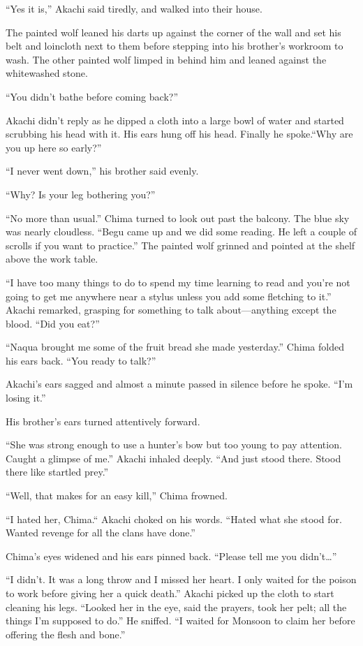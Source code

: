 ``Yes it is,'' Akachi said tiredly, and walked into their house.

The painted wolf leaned his darts up against the corner of the wall and set his belt and loincloth next to them before stepping into his brother's workroom to wash. The other painted wolf limped in behind him and leaned against the whitewashed stone.

``You didn't bathe before coming back?'' 

Akachi didn't reply as he dipped a cloth into a large bowl of water and started scrubbing his head with it. His ears hung off his head. Finally he spoke.``Why are you up here so early?''

``I never went down,'' his brother said evenly.

``Why? Is your leg bothering you?''

``No more than usual.'' Chima turned to look out past the balcony. The blue sky was nearly cloudless. ``Begu came up and we did some reading. He left a couple of scrolls if you want to practice.'' The painted wolf grinned and pointed at the shelf above the work table.

``I have too many things to do to spend my time learning to read and you're not going to get me anywhere near a stylus unless you add some fletching to it.'' Akachi remarked, grasping for something to talk about---anything except the blood. ``Did you eat?''

``Naqua brought me some of the fruit bread she made yesterday.'' Chima folded his ears back. ``You ready to talk?''

Akachi's ears sagged and almost a minute passed in silence before he spoke. ``I'm losing it.''

His brother's ears turned attentively forward.

``She was strong enough to use a hunter's bow but too young to pay attention. Caught a glimpse of me.'' Akachi inhaled deeply. ``And just stood there. Stood there like startled prey.''

``Well, that makes for an easy kill,'' Chima frowned. 

``I hated her, Chima.`` Akachi choked on his words. ``Hated what she stood for. Wanted revenge for all the clans have done.''

Chima's eyes widened and his ears pinned back. ``Please tell me you didn't\ldots''

``I didn't. It was a long throw and I missed her heart. I only waited for the poison to work before giving her a quick death.'' Akachi picked up the cloth to start cleaning his legs. ``Looked her in the eye, said the prayers, took her pelt; all the things I'm supposed to do.'' He sniffed. ``I  waited for Monsoon to claim her before offering the flesh and bone.''

